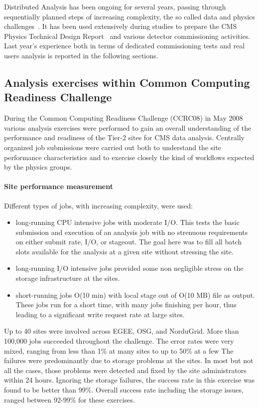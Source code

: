 Distributed Analysis has been ongoing for several years, passing through sequentially planned steps of 
increasing complexity, the so called data and physics challenges~\cite{RefPastExp}. 
It has been used extensively during studies to prepare the CMS Physics Technical Design Report~\cite{PTDR} and various detector commissioning activities. 
Last year's experience both in terms of dedicated commissioning tests and real users analysis is reported in the following sections.

\subsection{Analysis exercises within Common Computing Readiness Challenge}
\label{sec:5_1}
During the Common Computing Readiness Challenge (CCRC08) in May 2008
various analysis exercises were performed to gain an overall understanding 
of the performance and readiness of the Tier-2 sites for CMS data analysis.
Centrally organized job submissions were carried out both to understand the site performance characteristics and to exercise closely the kind of workflows
expected by the physics groups.
\paragraph{Site performance measurement}
Different types of jobs, with increasing complexity, were used:
\begin{itemize}
\item long-running CPU intensive jobs with moderate I/O. This tests the basic submission and execution of an analysis job with no strenuous requirements on 
either submit rate, I/O, or stageout. The goal here was to fill all batch slots available for the analysis at a given site without stressing the site.
\item long-running I/O intensive jobs provided some non negligible stress on 
the storage infrastructure at the sites.
\item short-running jobs O(10 min) with local stage out of O(10 MB) file as output. These jobs run for a short time, with many jobs finishing per hour, thus leading to a significant write request rate at large sites.
\end{itemize}
Up to 40 sites were involved across EGEE, OSG, and NorduGrid. More than 100,000 jobs succeeded throughout the challenge. The error rates were very mixed, ranging from less than 1\% at many sites to up to 50\% at a few %
The failures were predominantly due to storage problems at the sites. 
In most but not all the cases, those problems were detected and fixed by the site administrators within 24 hours. Ignoring the storage failures, the success rate in this exercise was found to be better than 99\%. Overall success rate including the storage issues, ranged between 92-99\% for these exercises.

